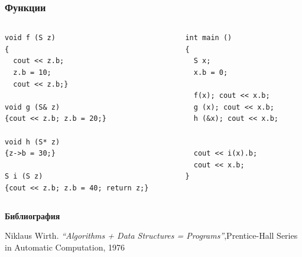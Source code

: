\documentclass{beamer}
\begin{document}
\begin{frame}[fragile]
\frametitle{Функции}


\begin{columns}[t]
  \begin{column}{0.6\textwidth}

\begin{flushleft}
\begin{lstlisting}
void f (S z)
{
  cout << z.b;
  z.b = 10;
  cout << z.b;}

void g (S& z)
{cout << z.b; z.b = 20;}

void h (S* z)
{z->b = 30;}

S i (S z)
{cout << z.b; z.b = 40; return z;}

\end{lstlisting}
\end{flushleft}
  \end{column}
  \begin{column}{0.4\textwidth}

\begin{flushleft}
\begin{lstlisting}
int main ()
{
  S x;
  x.b = 0;

  f(x); cout << x.b;
  g (x); cout << x.b;
  h (&x); cout << x.b;


  cout << i(x).b;
  cout << x.b;
}
\end{lstlisting}
\end{flushleft}


  \end{column}
\end{columns}



\end{frame}



\textbf {Библиография}
\begin{thebibliography}{9}

 Niklaus Wirth.  \emph{``Algorithms + Data Structures = Programs''},Prentice-Hall Series in Automatic Computation, 1976

\end{thebibliography}
\end{document}
